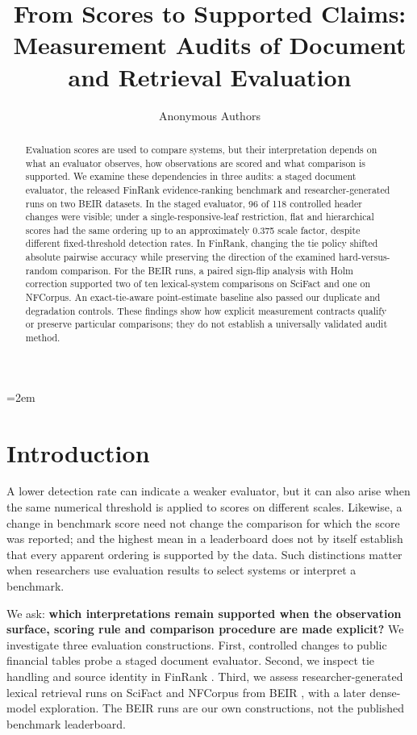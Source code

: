 \documentclass[runningheads]{llncs}
\begin{document}
\emergencystretch=2em
\title{From Scores to Supported Claims: Measurement Audits of Document and Retrieval Evaluation}
\author{Anonymous Authors}
\institute{}
\maketitle
\begin{abstract}
Evaluation scores are used to compare systems, but their interpretation
depends on what an evaluator observes, how observations are scored and
what comparison is supported. We examine these dependencies in three
audits: a staged document evaluator, the released FinRank
evidence-ranking benchmark and researcher-generated runs on two BEIR
datasets. In the staged evaluator, 96 of 118 controlled header changes
were visible; under a single-responsive-leaf restriction, flat and
hierarchical scores had the same ordering up to an approximately 0.375
scale factor, despite different fixed-threshold detection rates. In
FinRank, changing the tie policy shifted absolute pairwise accuracy
while preserving the direction of the examined hard-versus-random
comparison. For the BEIR runs, a paired sign-flip analysis with Holm
correction supported two of ten lexical-system comparisons on SciFact
and one on NFCorpus. An exact-tie-aware point-estimate baseline also
passed our duplicate and degradation controls. These findings show how
explicit measurement contracts qualify or preserve particular
comparisons; they do not establish a universally validated audit method.
\end{abstract}
\section{Introduction}\label{introduction}

A lower detection rate can indicate a weaker evaluator, but it can also
arise when the same numerical threshold is applied to scores on
different scales. Likewise, a change in benchmark score need not change
the comparison for which the score was reported; and the highest mean in
a leaderboard does not by itself establish that every apparent ordering
is supported by the data. Such distinctions matter when researchers use
evaluation results to select systems or interpret a benchmark.

We ask: \textbf{which interpretations remain supported when the
observation surface, scoring rule and comparison procedure are made
explicit?} We investigate three evaluation constructions. First,
controlled changes to public financial tables probe a staged document
evaluator. Second, we inspect tie handling and source identity in
FinRank \cite{r1}. Third, we assess researcher-generated lexical
retrieval runs on SciFact and NFCorpus from BEIR \cite{r2}, with a later
dense-model exploration. The BEIR runs are our own constructions, not
the published benchmark leaderboard.
\end{document}
